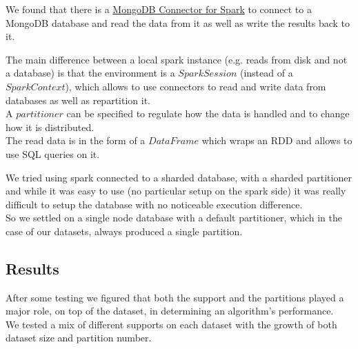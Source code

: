 \documentclass[a4paper]{article}
\begin{document}
	We found that there is a \href{https://www.mongodb.com/docs/spark-connector/current/}{MongoDB Connector for Spark} to connect to a MongoDB database and read the data from it as well as 	write the results back to it.
	
	The main difference between a local spark instance (e.g. reads from disk and not a database) is that the environment is a $SparkSession$ (instead of a $SparkContext$), which allows to use connectors to read and write data from databases as well as repartition it.\\
	A $partitioner$ can be specified to regulate how the data is handled and to change how it is distributed.\\	
	The read data is in the form of a $DataFrame$ which wraps an RDD and allows to use SQL queries on it.

	We tried using spark connected to a sharded database, with a sharded partitioner and while it was easy to use (no particular setup on the spark side) it was really difficult to setup the database with no noticeable execution difference.\\
	So we settled on a single node database with a default partitioner, which in the case of our datasets, always produced a single partition.\\

	\subsection{Results}
	After some testing we figured that both the support and the partitions played a major role, on top of the dataset,
	in determining an algorithm's performance.\\
	We tested a mix of different supports on each dataset with the growth of both dataset size and partition number.\\
\end{document}
